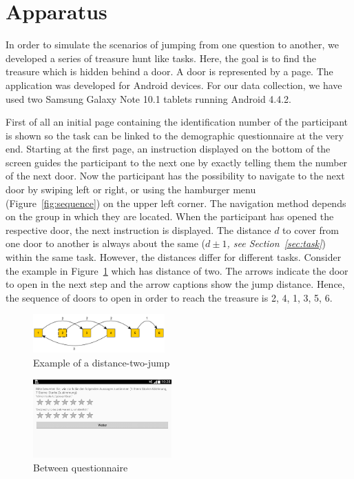 \documentclass{sig-alternate-05-2015}
\begin{document}
\section{Apparatus}
In order to simulate the scenarios of jumping from one question to another, we developed a series of treasure hunt like tasks. Here, the goal is to find the treasure which is hidden behind a door. A door is represented by a page. The application was developed for Android devices. For our data collection, we have used two Samsung Galaxy Note 10.1 tablets running Android 4.4.2.

First of all an initial page containing the identification number of the participant is shown so the task can be linked to the demographic questionnaire at the very end. Starting at the first page, an instruction displayed on the bottom of the screen guides the participant to the next one by exactly telling them the number of the next door. Now the participant has the possibility to navigate to the next door by swiping left or right, or using the hamburger menu (Figure~\ref{fig:sequence}) on the upper left corner. The navigation method depends on the group in which they are located. When the participant has opened the respective door, the next instruction is displayed. The distance $d$ to cover from one door to another is always about the same ($d \pm 1$\textit{, see Section~\ref{sec:task}}) within the same task. However, the distances differ for different tasks. Consider the example in Figure~\ref{fig:jump} which has distance of two. The arrows indicate the door to open in the next step and the arrow captions show the jump distance. Hence, the sequence of doors to open in order to reach the treasure is 2, 4, 1, 3, 5, 6.
\begin{figure}
	\centering
	\includegraphics[width=0.45\textwidth]{pics/jump}
	\caption{Example of a distance-two-jump}
	\label{fig:jump}
\end{figure}
\begin{figure}
	\centering
	\includegraphics[width=0.475\textwidth]{pics/screenshots/global3-cut}
	\caption{Between questionnaire}
	\label{fig:between_questionnaire}
\end{figure}
\end{document}
